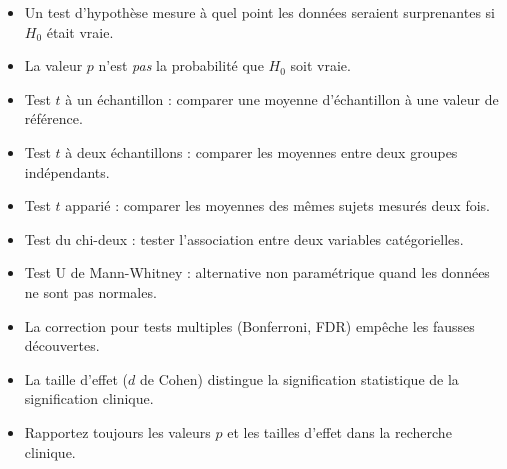 \begin{itemize}
  \item Un test d'hypoth\`ese mesure \`a quel point les donn\'ees seraient surprenantes si $H_0$ \'etait vraie.
  \item La valeur $p$ n'est \emph{pas} la probabilit\'e que $H_0$ soit vraie.
  \item Test $t$ \`a un \'echantillon : comparer une moyenne d'\'echantillon \`a une valeur de r\'ef\'erence.
  \item Test $t$ \`a deux \'echantillons : comparer les moyennes entre deux groupes ind\'ependants.
  \item Test $t$ appari\'e : comparer les moyennes des m\^emes sujets mesur\'es deux fois.
  \item Test du chi-deux : tester l'association entre deux variables cat\'egorielles.
  \item Test U de Mann-Whitney : alternative non param\'etrique quand les donn\'ees ne sont pas normales.
  \item La correction pour tests multiples (Bonferroni, FDR) emp\^eche les fausses d\'ecouvertes.
  \item La taille d'effet ($d$ de Cohen) distingue la signification statistique de la signification clinique.
  \item Rapportez toujours les valeurs $p$ et les tailles d'effet dans la recherche clinique.
\end{itemize}
